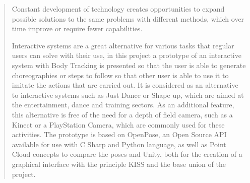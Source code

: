 \begin{quotation}
	\noindent Constant development of technology creates opportunities to expand possible solutions to the same problems with different methods, which over time improve or require fewer capabilities.
	
	Interactive systems are a great alternative for various tasks that regular users can solve with their use, in this project a prototype of an interactive system with Body Tracking is presented so that the user is able to generate choreographies or steps to follow so that other user is able to use it to imitate the actions that are carried out. It is considered as an alternative to interactive systems such as Just Dance or Shape up, which are aimed at the entertainment, dance and training sectors. As an additional feature, this alternative is free of the need for a depth of field camera, such as a Kinect or a PlayStation Camera, which are commonly used for these activities.
	The prototype is based on OpenPose, an Open Source API available for use with C Sharp and Python language, as well as Point Cloud concepts to compare the poses and Unity, both for the creation of a graphical interface with the principle KISS and the base union of the project.
\end{quotation}
\clearpage
